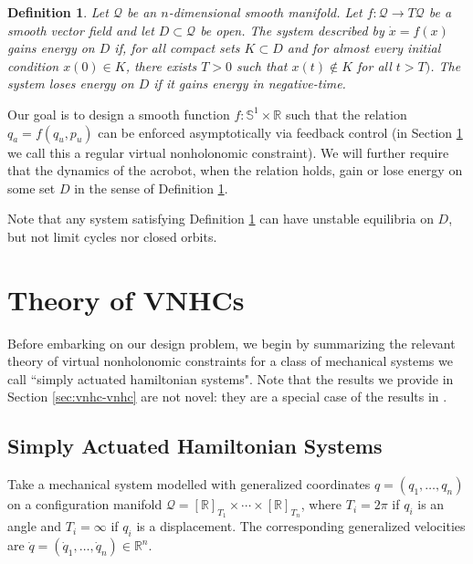 \documentclass[journal,twoside,onecolumn,draftclsnofoot,web]{ieeecolor}
\newtheorem{defn}{Definition} %
\newcommand*{\Rt}[1]{[\R]_{#1}}
\newcommand*{\R}{\mathbb{R}}
\newcommand*{\Sone}{\mathbb{S}^1}
\begin{document}
\begin{defn}\label{defn:energy-gain}
    Let \(\mathcal{Q}\) be an
    \(n\)-dimensional smooth manifold. 
    Let \(f : \mathcal{Q} \rightarrow T\mathcal{Q}\) be a smooth vector
    field and let \(D \subset \mathcal{Q}\) be open.
    The system described by \(\dot{x} = f(x)\) 
    \textit{gains energy on \(D\)} if, 
    for all compact sets \(K \subset D\) and for almost every initial
    condition \(x(0) \in K\), there exists \(T > 0\) such
    that \(x(t) \notin K\) for all \(t > T)\).
    The system \textit{loses energy on \(D\)} if it gains energy in
    negative-time.
\end{defn}

Our goal is to design a smooth function \(f : \Sone \times \R\) such that the
relation \(q_a = f(q_u,p_u)\) can be enforced asymptotically via feedback
control (in Section \ref{sec:vnhc} we call this a regular virtual
nonholonomic constraint).  
We will further require that the dynamics of the acrobot, when the relation
holds, gain or lose energy on some set \(D\) in the sense of Definition
\ref{defn:energy-gain}. 

Note that any system satisfying Definition \ref{defn:energy-gain}
can have unstable equilibria on \(D\), but not limit cycles nor closed orbits.

\section{Theory of VNHCs}\label{sec:vnhc}
Before embarking on our design problem, we begin by summarizing the relevant
theory of virtual nonholonomic constraints for a class of mechanical systems we
call ``simply actuated hamiltonian systems". 
Note that the results we provide in Section \ref{sec:vnhc-vnhc} are not novel:
they are a special case of the results in
\cite{hybrid_zero_dynamics_bipedal_nhvcs}.

\subsection{Simply Actuated Hamiltonian Systems} \label{sec:vnhc-sah}
Take a mechanical system modelled with generalized coordinates 
\(q = (q_1, \ldots, q_n)\) on a configuration manifold
\(\mathcal{Q} = \Rt{T_1} \times \cdots \times \Rt{T_n}\), where
\(T_i = 2\pi\) if \(q_i\) is an angle and \(T_i = \infty\) if \(q_i\) is a
displacement. The corresponding generalized velocities are 
\(\dot{q} = (\dot{q}_1,\ldots,\dot{q}_n) \in \R^n\).
\end{document}
